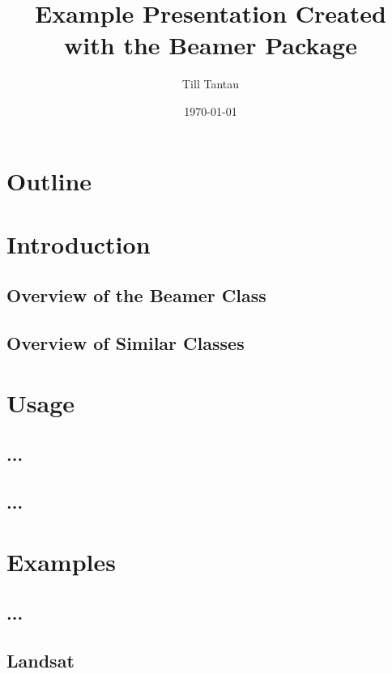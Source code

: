 \documentclass[pdflatex,compress,8pt,
	xcolor={dvipsnames,dvipsnames,svgnames,x11names,table},
	hyperref={colorlinks = true,breaklinks = true, urlcolor = NavyBlue, breaklinks = true}]{beamer}
\title{Example Presentation Created with the Beamer Package}
\author{Till Tantau}
\date{\today}
\begin{document}
\begin{frame}
           \titlepage
\end{frame}

\section*{Outline}
        \begin{frame}
           \tableofcontents
         \end{frame}

\section{Introduction}
         \subsection{Overview of the Beamer Class}
         \subsection{Overview of Similar Classes}

\section{Usage} \subsection{...} \subsection{...}

\section{Examples} \subsection{...}

\subsection{Landsat}
         \begin{frame}
         \end{frame} %
\end{document}
